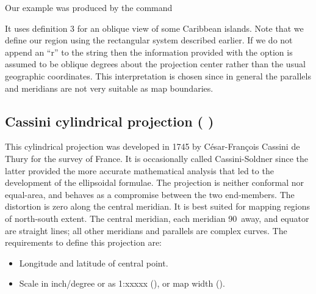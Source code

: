 Our example was produced by the command 



It uses definition 3 for an oblique view of some Caribbean islands.
Note that we define our region using the rectangular system
described earlier.  If we do not append an ``r'' to the 
string then the information provided with the  option is
assumed to be oblique degrees about the projection center rather
than the usual geographic coordinates.  This interpretation is
chosen since in general the parallels and meridians are not very
suitable as map boundaries.


\subsection{Cassini cylindrical projection ( )}


This cylindrical projection was developed in 1745 by C\'{e}sar-Fran\c{c}ois
Cassini de Thury for the survey of France.  It is occasionally called
Cassini-Soldner since the latter provided the more accurate
mathematical analysis that led to the development of the
ellipsoidal formulae.  The projection is neither conformal
nor equal-area, and behaves as a compromise between the two
end-members.  The distortion is zero along the central meridian.
It is best suited for mapping regions of north-south extent.
The central meridian, each meridian 90\DS\ away, and equator
are straight lines; all other meridians and parallels are
complex curves.  The requirements to define this projection are:

\begin{itemize} 
\item Longitude and latitude of central point.
\item Scale in inch/degree or as 1:xxxxx (), or map width ().
\end{itemize}

